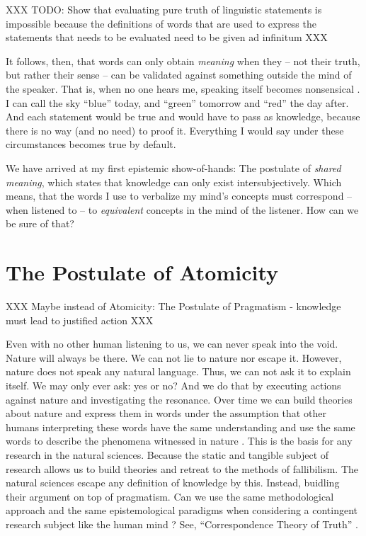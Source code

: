 XXX TODO: Show that evaluating pure truth of linguistic statements is impossible because the definitions of words that are used to express the statements that needs to be evaluated need to be given ad infinitum XXX

It follows, then, that words can only obtain \textit{meaning} when they -- not their truth, but rather their sense -- can be validated against something outside the mind of the speaker.
That is, when no one hears me, speaking itself becomes nonsensical \parencite{wittgenstein-33}.
I can call the sky \enquote{blue} today, and \enquote{green} tomorrow and \enquote{red} the day after.
And each statement would be true and would have to pass as knowledge, because there is no way (and no need) to proof it.
Everything I would say under these circumstances becomes true by default.

We have arrived at my first epistemic show-of-hands: The postulate of \textit{shared meaning}, which states that knowledge can only exist intersubjectively.
Which means, that the words I use to verbalize my mind's concepts must correspond -- when listened to -- to \textit{equivalent} concepts in the mind of the listener.
How can we be sure of that?


\section{The Postulate of Atomicity}

XXX Maybe instead of Atomicity: The Postulate of Pragmatism - knowledge must lead to justified action XXX

Even with no other human listening to us, we can never speak into the void.
Nature will always be there.
We can not lie to nature nor escape it.
However, nature does not speak any natural language.
Thus, we can not ask it to explain itself.
We may only ever ask: yes or no?
And we do that by executing actions against nature and investigating the resonance.
Over time we can build theories about nature and express them in words under the assumption that other humans interpreting these words have the same understanding and use the same words to describe the phenomena witnessed in nature \parencite[1011b]{aristotle-33}.
This is the basis for any research in the natural sciences.
Because the static and tangible subject of research allows us to build theories and retreat to the methods of fallibilism.
The natural sciences escape any definition of knowledge by this.
Instead, buidling their argument on top of pragmatism.
Can we use the same methodological approach and the same epistemological paradigms when considering a contingent research subject like the human mind \parencite{frank-07}?
See, \enquote{Correspondence Theory of Truth} \parencite{david-22}.

